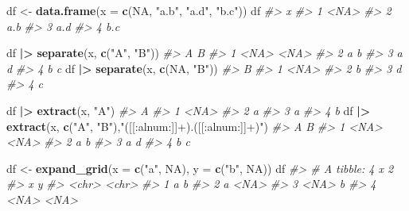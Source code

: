 \documentclass[
]{book}
\newenvironment{Shaded}{\begin{snugshade}}{\end{snugshade}}
\newcommand{\AttributeTok}[1]{\textcolor[rgb]{0.13,0.29,0.53}{#1}}
\newcommand{\CommentTok}[1]{\textcolor[rgb]{0.56,0.35,0.01}{\textit{#1}}}
\newcommand{\ConstantTok}[1]{\textcolor[rgb]{0.56,0.35,0.01}{#1}}
\newcommand{\FunctionTok}[1]{\textcolor[rgb]{0.13,0.29,0.53}{\textbf{#1}}}
\newcommand{\NormalTok}[1]{#1}
\newcommand{\OtherTok}[1]{\textcolor[rgb]{0.56,0.35,0.01}{#1}}
\newcommand{\SpecialCharTok}[1]{\textcolor[rgb]{0.81,0.36,0.00}{\textbf{#1}}}
\newcommand{\StringTok}[1]{\textcolor[rgb]{0.31,0.60,0.02}{#1}}
\begin{document}
\begin{Shaded}
\begin{Highlighting}[]
\NormalTok{df }\OtherTok{\textless{}{-}} \FunctionTok{data.frame}\NormalTok{(}\AttributeTok{x =} \FunctionTok{c}\NormalTok{(}\ConstantTok{NA}\NormalTok{, }\StringTok{"a.b"}\NormalTok{, }\StringTok{"a.d"}\NormalTok{, }\StringTok{"b.c"}\NormalTok{))}
\NormalTok{df  }
\CommentTok{\#\textgreater{}      x}
\CommentTok{\#\textgreater{} 1 \textless{}NA\textgreater{}}
\CommentTok{\#\textgreater{} 2  a.b}
\CommentTok{\#\textgreater{} 3  a.d}
\CommentTok{\#\textgreater{} 4  b.c}
  
\NormalTok{df }\SpecialCharTok{|\textgreater{}} \FunctionTok{separate}\NormalTok{(x, }\FunctionTok{c}\NormalTok{(}\StringTok{"A"}\NormalTok{, }\StringTok{"B"}\NormalTok{))}
\CommentTok{\#\textgreater{}      A    B}
\CommentTok{\#\textgreater{} 1 \textless{}NA\textgreater{} \textless{}NA\textgreater{}}
\CommentTok{\#\textgreater{} 2    a    b}
\CommentTok{\#\textgreater{} 3    a    d}
\CommentTok{\#\textgreater{} 4    b    c}
\NormalTok{df }\SpecialCharTok{|\textgreater{}} \FunctionTok{separate}\NormalTok{(x, }\FunctionTok{c}\NormalTok{(}\ConstantTok{NA}\NormalTok{, }\StringTok{"B"}\NormalTok{))}
\CommentTok{\#\textgreater{}      B}
\CommentTok{\#\textgreater{} 1 \textless{}NA\textgreater{}}
\CommentTok{\#\textgreater{} 2    b}
\CommentTok{\#\textgreater{} 3    d}
\CommentTok{\#\textgreater{} 4    c}
  
\NormalTok{df }\SpecialCharTok{|\textgreater{}} \FunctionTok{extract}\NormalTok{(x, }\StringTok{"A"}\NormalTok{)}
\CommentTok{\#\textgreater{}      A}
\CommentTok{\#\textgreater{} 1 \textless{}NA\textgreater{}}
\CommentTok{\#\textgreater{} 2    a}
\CommentTok{\#\textgreater{} 3    a}
\CommentTok{\#\textgreater{} 4    b}
\NormalTok{df }\SpecialCharTok{|\textgreater{}} \FunctionTok{extract}\NormalTok{(x, }\FunctionTok{c}\NormalTok{(}\StringTok{"A"}\NormalTok{, }\StringTok{"B"}\NormalTok{),}\StringTok{"([[:alnum:]]+).([[:alnum:]]+)"}\NormalTok{)}
\CommentTok{\#\textgreater{}      A    B}
\CommentTok{\#\textgreater{} 1 \textless{}NA\textgreater{} \textless{}NA\textgreater{}}
\CommentTok{\#\textgreater{} 2    a    b}
\CommentTok{\#\textgreater{} 3    a    d}
\CommentTok{\#\textgreater{} 4    b    c}
  
\NormalTok{df }\OtherTok{\textless{}{-}} \FunctionTok{expand\_grid}\NormalTok{(}\AttributeTok{x =} \FunctionTok{c}\NormalTok{(}\StringTok{"a"}\NormalTok{, }\ConstantTok{NA}\NormalTok{), }\AttributeTok{y =} \FunctionTok{c}\NormalTok{(}\StringTok{"b"}\NormalTok{, }\ConstantTok{NA}\NormalTok{))}
\NormalTok{df}
\CommentTok{\#\textgreater{} \# A tibble: 4 x 2}
\CommentTok{\#\textgreater{}   x     y    }
\CommentTok{\#\textgreater{}   \textless{}chr\textgreater{} \textless{}chr\textgreater{}}
\CommentTok{\#\textgreater{} 1 a     b    }
\CommentTok{\#\textgreater{} 2 a     \textless{}NA\textgreater{} }
\CommentTok{\#\textgreater{} 3 \textless{}NA\textgreater{}  b    }
\CommentTok{\#\textgreater{} 4 \textless{}NA\textgreater{}  \textless{}NA\textgreater{}}
  

\end{Highlighting}
\end{Shaded}
\end{document}
